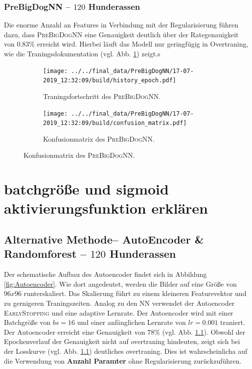 \subsubsection{PreBigDogNN -- $120$ Hunderassen}
Die enorme Anzahl an Features in Verbindung mit der Regularisierung führen dazu,
dass \textsc{PreBigDogNN} eine Genauigkeit deutlich über der Rategenauigkeit
von $0.83\%$ erreicht wird. Hierbei läuft das Modell nur geringfügig in Overtraning,
wie die Traningsdokumentation (vgl. Abb. \ref{fig:PreBigDogNN_Loss_Acc}) zeigt.s
\begin{figure}
\centering
\begin{subfigure}{0.48\textwidth}
\centering
\texttt{[image: ../../final\_data/PreBigDogNN/17-07-2019\_12:32:09/build/history\_epoch.pdf]}
\caption{Traningsfortschritt des \textsc{PreBigDogNN}.}
\label{fig:PreBigDogNN_Loss_Acc}
\end{subfigure}
\begin{subfigure}{0.48\textwidth}
\centering
\texttt{[image: ../../final\_data/PreBigDogNN/17-07-2019\_12:32:09/build/confusion\_matrix.pdf]}
\caption{Konfusionmatrix des \textsc{PreBigDogNN}.}
\label{fig:PreBigDogNN_Konfusionmatrix}
\end{subfigure}
\end{figure}
\section{batchgröße und sigmoid aktivierungsfunktion erklären}
\subsection{Alternative Methode-- AutoEncoder \& Randomforest -- $120$ Hunderassen}
Der schematische Aufbau des Autoencoder findet sich in Abbildung \ref{fig:Autoencoder}.
Wie dort angedeutet, werden die Bilder auf eine Größe von $96x96$ runterskaliert.
Das Skalierung führt zu einem kleineren Featurevektor und zu gernigeren
Traningszeiten. Analog zu den NN verwendet der Autoencoder \textsc{EarlyStopping}
und eine adaptive Lernrate. Der Autoencoder wird mit einer Batchgröße
von $bs=16$ und einer anfänglichen Lernrate von $lr=0.001$ traniert. Der Autoencoder
erreicht eine Genauigkeit von $78\%$ (vgl. Abb. \ref{}). Obwohl der Epochenverlauf
der Genauigkeit nicht auf overtraning hindeuten, zeigt sich bei der Losskurve
(vgl. Abb. \ref{}) deutliches overtraning. Dies ist wahrscheinlicha auf die
Verwendung von \textbf{Anzahl Paramter} ohne Regularisierung zurückzuführen.

